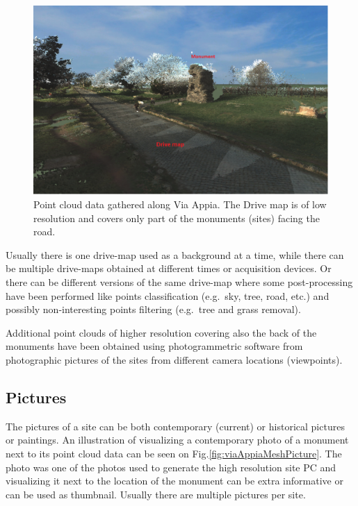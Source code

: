 \begin{figure}[!ht]
\centering
\includegraphics[scale=0.5]{fig/conceptual_description/ViaAppiaPCAnnot.pdf}
\caption{Point cloud data gathered along Via Appia. The Drive map is of low resolution and covers only part of the monuments (sites) facing the road.}
\label{fig:viaAppiaPointCloud}
\end{figure}

Usually there is one drive-map used as a background at a time, while there can be multiple drive-maps obtained at different times or acquisition devices. Or there can be different versions of the same drive-map where some post-processing have been performed like points classification (e.g.\ sky, tree, road, etc.) and possibly non-interesting points filtering (e.g.\ tree and grass removal).

Additional point clouds of higher resolution covering also the back of the monuments have been obtained using photogrammetric software from photographic pictures of the sites from different camera locations (viewpoints). 

\subsection{Pictures}
The pictures of a site can be both contemporary (current) or historical pictures or paintings. An illustration of visualizing a contemporary photo of a monument next to its point cloud data can be seen on Fig.\ref{fig:viaAppiaMeshPicture}. The photo was one of the photos used to generate the high resolution site PC and visualizing it next to the location of the monument can be extra informative or can be used as thumbnail. Usually there are multiple pictures per site.

